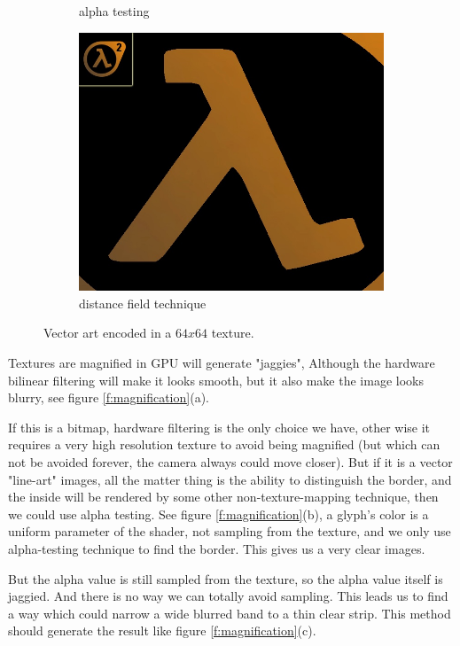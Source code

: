 \begin{figure}
\begin{subfigure}[t]{.33\textwidth}
		\caption{alpha testing}
	\end{subfigure}
	\begin{subfigure}[t]{.33\textwidth}
		\includegraphics[width=1.0\textwidth]{graphics/df/distance-field-glyph}
		\caption{distance field technique}
	\end{subfigure}
	\caption{Vector art encoded in a $64x64$ texture.}
\end{figure}

Textures are magnified in GPU will generate "jaggies", Although the hardware bilinear filtering will make it looks smooth, but it also make the image looks blurry, see figure \ref{f:magnification}(a). 


If this is a bitmap, hardware filtering is the only choice we have, other wise it requires a very high resolution texture to avoid being magnified (but which can not be avoided forever, the camera always could move closer). But if it is a vector "line-art" images, all the matter thing is the ability to distinguish the border, and the inside will be rendered by some other non-texture-mapping technique, then we could use alpha testing. See figure \ref{f:magnification}(b), a glyph's color is a uniform parameter of the shader, not sampling from the texture, and we only use alpha-testing technique to find the border. This gives us a very clear images.

But the alpha value is still sampled from the texture, so the alpha value itself is jaggied. And there is no way we can totally avoid sampling. This leads us to find a way which could narrow a wide blurred band to a thin clear strip. This method should generate the result like figure \ref{f:magnification}(c). 

